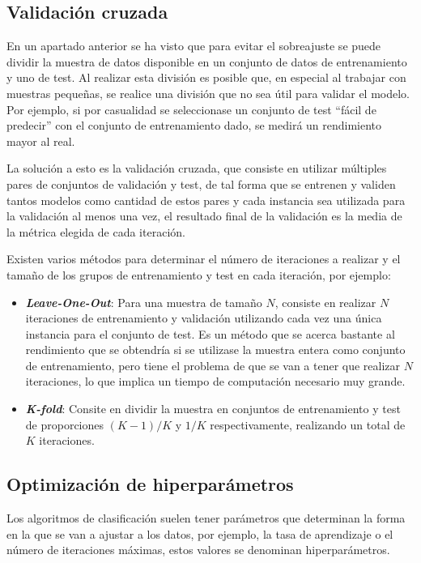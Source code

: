 \subsection{Validación cruzada}

En un apartado anterior se ha visto que para evitar el sobreajuste se puede
dividir la muestra de datos disponible en un conjunto de datos de entrenamiento
y uno de test. Al realizar esta división es posible que, en especial al trabajar
con muestras pequeñas, se realice una división que no sea útil para validar el
modelo. Por ejemplo, si por casualidad se seleccionase un conjunto de test
``fácil de predecir'' con el conjunto de entrenamiento dado, se medirá un
rendimiento mayor al real.

La solución a esto es la validación cruzada, que consiste en utilizar múltiples
pares de conjuntos de validación y test, de tal forma que se entrenen y validen
tantos modelos como cantidad de estos pares y cada instancia sea utilizada para
la validación al menos una vez, el resultado final de la validación es la media
de la métrica elegida de cada iteración.

Existen varios métodos para determinar el número de iteraciones a realizar y el
tamaño de los grupos de entrenamiento y test en cada iteración, por ejemplo:

\begin{itemize}
    \item \textbf{\textit{Leave-One-Out}}: Para una muestra de tamaño $N$,
    consiste en realizar $N$ iteraciones de entrenamiento y validación
    utilizando cada vez una única instancia para el conjunto de test. Es un
    método que se acerca bastante al rendimiento que se obtendría si se
    utilizase la muestra entera como conjunto de entrenamiento, pero tiene el
    problema de que se van a tener que realizar $N$ iteraciones, lo que implica
    un tiempo de computación necesario muy grande.
    \item \textbf{\textit{K-fold}}: Consite en dividir la muestra en conjuntos
    de entrenamiento y test de proporciones $(K-1)/K$ y $1/K$ respectivamente,
    realizando un total de $K$ iteraciones.
\end{itemize}

\subsection{Optimización de hiperparámetros}

Los algoritmos de clasificación suelen tener parámetros que determinan la forma
en la que se van a ajustar a los datos, por ejemplo, la tasa de aprendizaje o el
número de iteraciones máximas, estos valores se denominan hiperparámetros.

